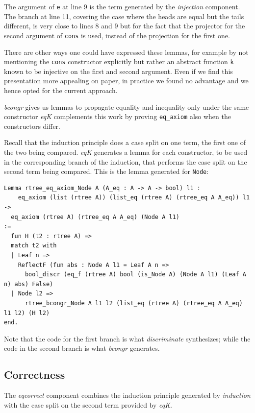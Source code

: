 \documentclass[a4paper,UKenglish,cleveref, autoref]{lipics-v2019}
\newcommand{\derive}[1]{\emph{#1}}
\begin{document}
The argument of \lstinline+e+ at line 9
is the term generated by the \derive{injection} component.
The branch at line 11, covering the case where
the heads are equal but the tails different, is very close
to lines 8 and 9 but for the fact that the projector for
the second argument of \lstinline+cons+ is used, instead of the
projection for the first one.

There are other ways one could have expressed these lemmas,
for example by not mentioning the \lstinline+cons+
constructor explicitly but rather an abstract function \lstinline+k+
known to be injective on the first and second argument.
Even if we find this presentation more appealing on paper, in practice
we found no advantage and we hence opted for the current approach.

\derive{bcongr} gives us lemmas to propagate
equality and inequality only under the same constructor
\derive{eqK} complements this work 
by proving \lstinline+eq_axiom+ also when the constructors differ.

Recall that the induction principle does a case split on one term, the first
one of the two being compared.  \derive{eqK} generates a lemma for each
constructor, to be used in the corresponding branch of the induction, that
performs the case split on the second term being compared.  This is the lemma
generated for \lstinline+Node+:

\begin{lstlisting}
Lemma rtree_eq_axiom_Node A (A_eq : A -> A -> bool) l1 :
    eq_axiom (list (rtree A)) (list_eq (rtree A) (rtree_eq A A_eq)) l1 ->
  eq_axiom (rtree A) (rtree_eq A A_eq) (Node A l1)
:=
  fun H (t2 : rtree A) =>
  match t2 with
  | Leaf n =>
    ReflectF (fun abs : Node A l1 = Leaf A n =>
      bool_discr (eq_f (rtree A) bool (is_Node A) (Node A l1) (Leaf A n) abs) False)
  | Node l2 =>
      rtree_bcongr_Node A l1 l2 (list_eq (rtree A) (rtree_eq A A_eq) l1 l2) (H l2)
end.
\end{lstlisting}

\noindent
Note that the code for the first branch is what
\derive{discriminate} synthesizes; while the code
in the second branch is what \derive{bcongr} generates.

\subsection{Correctness} %
\label{sec:derive:eqcorrect}

The \derive{eqcorrect} component combines the induction
principle generated by \derive{induction} with the
case split on the second term provided by \derive{eqK}.
\end{document}
